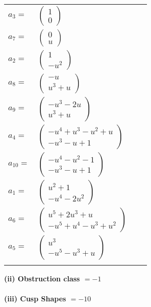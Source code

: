 \documentclass[1p]{elsarticle_modified}
\theoremstyle{definition}
\begin{document}
\begin{tabular}{m{7pt} m{180pt} m{7pt} m{180pt} }
\flushright $a_{3}=$&$\begin{pmatrix}1\\0\end{pmatrix}$ \\
\flushright $a_{7}=$&$\begin{pmatrix}0\\u\end{pmatrix}$ \\
\flushright $a_{2}=$&$\begin{pmatrix}1\\- u^2\end{pmatrix}$ \\
\flushright $a_{8}=$&$\begin{pmatrix}- u\\u^3+u\end{pmatrix}$ \\
\flushright $a_{9}=$&$\begin{pmatrix}- u^3-2 u\\u^3+u\end{pmatrix}$ \\
\flushright $a_{4}=$&$\begin{pmatrix}- u^4+u^3- u^2+u\\- u^3- u+1\end{pmatrix}$ \\
\flushright $a_{10}=$&$\begin{pmatrix}- u^4- u^2-1\\- u^3- u+1\end{pmatrix}$ \\
\flushright $a_{1}=$&$\begin{pmatrix}u^2+1\\- u^4-2 u^2\end{pmatrix}$ \\
\flushright $a_{6}=$&$\begin{pmatrix}u^5+2 u^3+u\\- u^5+u^4- u^3+u^2\end{pmatrix}$ \\
\flushright $a_{5}=$&$\begin{pmatrix}u^3\\- u^5- u^3+u\end{pmatrix}$\\&\end{tabular}
\flushleft \textbf{(ii) Obstruction class $= -1$}\\~\\
\flushleft \textbf{(iii) Cusp Shapes $= -10$}\\~\\
\end{document}
